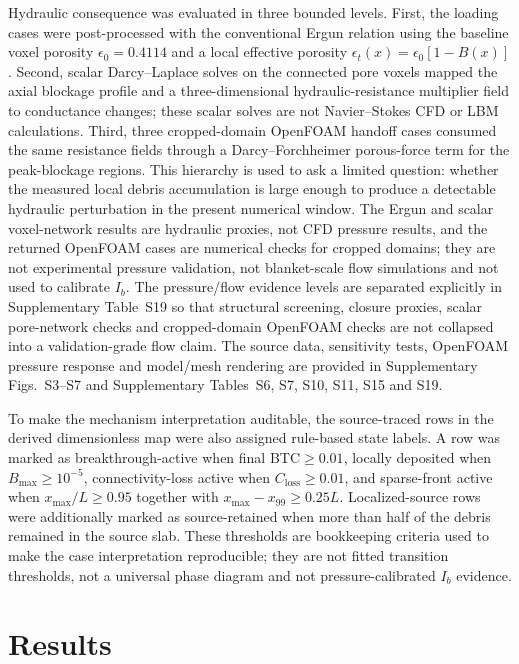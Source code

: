 \documentclass[preprint,12pt,authoryear]{elsarticle}
\newcommand{\BTC}{BTC\xspace}
\newcommand{\Ib}{$I_b$\xspace}
\begin{document}
Hydraulic consequence was evaluated in three bounded levels. First, the loading cases were post-processed with the conventional Ergun relation using the baseline voxel porosity $\epsilon_0 = 0.4114$ and a local effective porosity $\epsilon_t(x)=\epsilon_0[1-B(x)]$. Second, scalar Darcy--Laplace solves on the connected pore voxels mapped the axial blockage profile and a three-dimensional hydraulic-resistance multiplier field to conductance changes; these scalar solves are not Navier--Stokes CFD or LBM calculations. Third, three cropped-domain OpenFOAM handoff cases consumed the same resistance fields through a Darcy--Forchheimer porous-force term for the peak-blockage regions. This hierarchy is used to ask a limited question: whether the measured local debris accumulation is large enough to produce a detectable hydraulic perturbation in the present numerical window. The Ergun and scalar voxel-network results are hydraulic proxies, not CFD pressure results, and the returned OpenFOAM cases are numerical checks for cropped domains; they are not experimental pressure validation, not blanket-scale flow simulations and not used to calibrate \Ib. The pressure/flow evidence levels are separated explicitly in Supplementary Table~S19 so that structural screening, closure proxies, scalar pore-network checks and cropped-domain OpenFOAM checks are not collapsed into a validation-grade flow claim. The source data, sensitivity tests, OpenFOAM pressure response and model/mesh rendering are provided in Supplementary Figs.~S3--S7 and Supplementary Tables~S6, S7, S10, S11, S15 and S19.

To make the mechanism interpretation auditable, the source-traced rows in the derived dimensionless map were also assigned rule-based state labels. A row was marked as breakthrough-active when final \BTC $\geq 0.01$, locally deposited when $B_{\max}\geq10^{-5}$, connectivity-loss active when $C_{\mathrm{loss}}\geq0.01$, and sparse-front active when $x_{\max}/L\geq0.95$ together with $x_{\max}-x_{99}\geq0.25L$. Localized-source rows were additionally marked as source-retained when more than half of the debris remained in the source slab. These thresholds are bookkeeping criteria used to make the case interpretation reproducible; they are not fitted transition thresholds, not a universal phase diagram and not pressure-calibrated \Ib evidence.

\section{Results}
\end{document}
